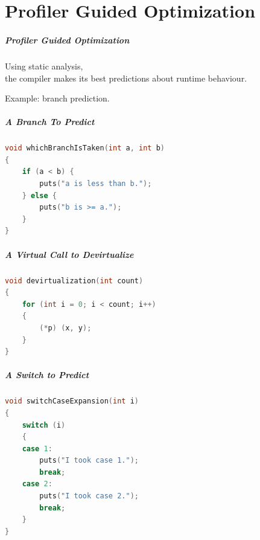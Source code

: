 \part{Profiler Guided Optimization}
\begin{frame}
\partpage
\end{frame}

\begin{frame}
\frametitle{Profiler Guided Optimization}

\Large
\begin{changemargin}{2cm}

Using static analysis, \\
the compiler makes its best predictions about runtime behaviour.

Example: branch prediction. 
\end{changemargin}

\end{frame}



\begin{frame}[fragile]
\frametitle{A Branch To Predict}
\begin{changemargin}{1.5cm}
\begin{lstlisting}[language=C,basicstyle=\large]
void whichBranchIsTaken(int a, int b)
{
    if (a < b) {
        puts("a is less than b.");
    } else {
        puts("b is >= a.");
    }
}
\end{lstlisting}
\end{changemargin}
\end{frame}

\begin{frame}[fragile]
\frametitle{A Virtual Call to Devirtualize}

\begin{changemargin}{2cm}
\begin{lstlisting}[language=C,basicstyle=\large]
void devirtualization(int count)
{
    for (int i = 0; i < count; i++)
    {
        (*p) (x, y);
    }
}
\end{lstlisting}
\end{changemargin}
\end{frame}

\begin{frame}[fragile]
\frametitle{A Switch to Predict}
\begin{changemargin}{2cm}
\begin{lstlisting}[language=C,basicstyle=\large]
void switchCaseExpansion(int i)
{
    switch (i)
    {
    case 1:
        puts("I took case 1.");
        break;
    case 2:
        puts("I took case 2.");
        break;
    }
}
\end{lstlisting}
\end{changemargin}
\end{frame}




